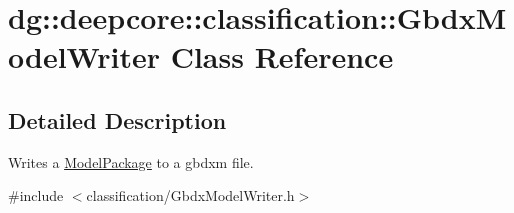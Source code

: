\hypertarget{classdg_1_1deepcore_1_1classification_1_1_gbdx_model_writer}{}\section{dg\+:\+:deepcore\+:\+:classification\+:\+:Gbdx\+Model\+Writer Class Reference}
\label{classdg_1_1deepcore_1_1classification_1_1_gbdx_model_writer}


\subsection{Detailed Description}
Writes a \hyperlink{classdg_1_1deepcore_1_1classification_1_1_model_package}{Model\+Package} to a gbdxm file. 

{\ttfamily \#include $<$classification/\+Gbdx\+Model\+Writer.\+h$>$}

